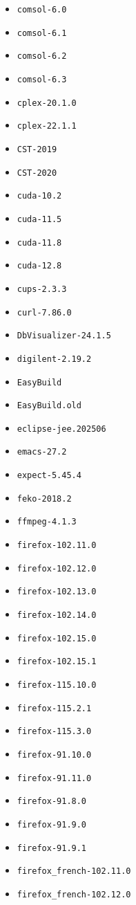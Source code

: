 \begin{multicols}{3}
\begin{itemize}
\item \verb|comsol-6.0|
\item \verb|comsol-6.1|
\item \verb|comsol-6.2|
\item \verb|comsol-6.3|
\item \verb|cplex-20.1.0|
\item \verb|cplex-22.1.1|
\item \verb|CST-2019|
\item \verb|CST-2020|
\item \verb|cuda-10.2|
\item \verb|cuda-11.5|
\item \verb|cuda-11.8|
\item \verb|cuda-12.8|
\item \verb|cups-2.3.3|
\item \verb|curl-7.86.0|
\item \verb|DbVisualizer-24.1.5|
\item \verb|digilent-2.19.2|
\item \verb|EasyBuild|
\item \verb|EasyBuild.old|
\item \verb|eclipse-jee.202506|
\item \verb|emacs-27.2|
\item \verb|expect-5.45.4|
\item \verb|feko-2018.2|
\item \verb|ffmpeg-4.1.3|
\item \verb|firefox-102.11.0|
\item \verb|firefox-102.12.0|
\item \verb|firefox-102.13.0|
\item \verb|firefox-102.14.0|
\item \verb|firefox-102.15.0|
\item \verb|firefox-102.15.1|
\item \verb|firefox-115.10.0|
\item \verb|firefox-115.2.1|
\item \verb|firefox-115.3.0|
\item \verb|firefox-91.10.0|
\item \verb|firefox-91.11.0|
\item \verb|firefox-91.8.0|
\item \verb|firefox-91.9.0|
\item \verb|firefox-91.9.1|
\item \verb|firefox_french-102.11.0|
\item \verb|firefox_french-102.12.0|

\end{itemize}
\end{multicols}

